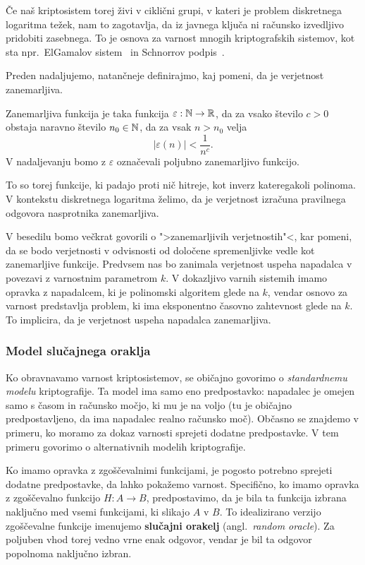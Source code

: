 Če naš kriptosistem torej živi v ciklični grupi, v kateri je problem diskretnega logaritma težek,
nam to zagotavlja, da iz javnega ključa ni računsko izvedljivo pridobiti zasebnega. To je osnova
za varnost mnogih kriptografskih sistemov, kot sta npr.\ ElGamalov sistem~\cite{elgamal1985elgamal}
in Schnorrov podpis~\cite{schnorr1989sig}.

Preden nadaljujemo, natančneje definirajmo, kaj pomeni, da je verjetnost zanemarljiva.

\begin{definicija}
    Zanemarljiva funkcija je taka funkcija $\varepsilon : \mathbb N \rightarrow \mathbb R$, da za vsako število
    $c > 0$ obstaja naravno število $n_0 \in \mathbb N$, da za vsak $n > n_0$ velja
    $$
    |\varepsilon(n)| < \frac{1}{n^c}.
    $$
    V nadaljevanju bomo z $\varepsilon$ označevali poljubno zanemarljivo funkcijo.
\end{definicija}

To so torej funkcije, ki padajo proti nič hitreje, kot inverz kateregakoli polinoma. V kontekstu
diskretnega logaritma želimo, da je verjetnost izračuna pravilnega odgovora nasprotnika zanemarljiva.

V besedilu bomo večkrat govorili o ">zanemarljivih verjetnostih"<, kar pomeni, da se bodo
verjetnosti v odvisnosti od določene spremenljivke vedle kot zanemarljive funkcije. Predvsem nas bo
zanimala verjetnost uspeha napadalca v povezavi z varnostnim parametrom $k$. V dokazljivo varnih sistemih
imamo opravka z napadalcem, ki je polinomski algoritem glede na $k$, vendar osnovo za varnost predstavlja
problem, ki ima eksponentno časovno zahtevnost glede na $k$. To implicira, da je verjetnost uspeha
napadalca zanemarljiva.

\subsubsection{Model slučajnega oraklja}
Ko obravnavamo varnost kriptosistemov, se običajno govorimo o \textit{standardnemu modelu} kriptografije.
Ta model ima samo eno predpostavko: napadalec je omejen samo s časom in računsko močjo, ki mu
je na voljo (tu je običajno predpostavljeno, da ima napadalec realno računsko moč). Občasno se znajdemo
v primeru, ko moramo za dokaz varnosti sprejeti dodatne predpostavke. V tem primeru govorimo o
alternativnih modelih kriptografije.

Ko imamo opravka z zgoščevalnimi funkcijami, je pogosto potrebno sprejeti dodatne predpostavke, da lahko
pokažemo varnost. Specifično, ko imamo opravka z zgoščevalno funkcijo $H: A \rightarrow B$, predpostavimo,
da je bila ta funkcija izbrana naključno med vsemi funkcijami, ki slikajo $A$ v $B$. To idealizirano 
verzijo zgoščevalne funkcije imenujemo \textbf{slučajni orakelj} (angl.\ \textit{random oracle}).
Za poljuben vhod torej vedno vrne enak odgovor, vendar je bil ta odgovor popolnoma naključno izbran.

